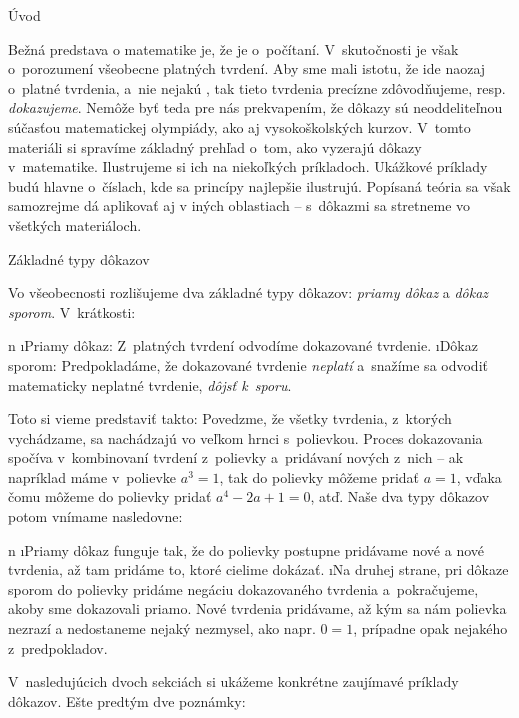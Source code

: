 





\sec Úvod

Bežná predstava o matematike je, že je o~počítaní. V~skutočnosti je však o~porozumení všeobecne platných tvrdení. Aby sme mali istotu, že ide naozaj o~platné tvrdenia, a~nie nejakú , tak tieto tvrdenia precízne zdôvodňujeme, resp. \textit{dokazujeme}. Nemôže byť teda pre nás prekvapením, že dôkazy sú neoddeliteľnou súčasťou matematickej olympiády, ako aj vysokoškolských kurzov. V~tomto materiáli si spravíme základný prehľad o~tom, ako vyzerajú dôkazy v~matematike. Ilustrujeme si ich na niekoľkých príkladoch. Ukážkové príklady budú hlavne o~číslach, kde sa princípy najlepšie ilustrujú. Popísaná teória sa však samozrejme dá aplikovať aj v iných oblastiach -- s~dôkazmi sa stretneme vo všetkých materiáloch.

\sec Základné typy dôkazov

Vo všeobecnosti rozlišujeme dva základné typy dôkazov: \textit{priamy dôkaz} a \textit{dôkaz sporom}. V~krátkosti:

\begitems \style n
\i Priamy dôkaz: Z~platných tvrdení odvodíme dokazované tvrdenie. 
\i Dôkaz sporom: Predpokladáme, že dokazované tvrdenie \textit{neplatí} a~snažíme sa odvodiť matematicky neplatné tvrdenie, \textit{dôjsť k~sporu}.
\enditems 

Toto si vieme predstaviť takto: Povedzme, že všetky tvrdenia, z~ktorých vychádzame, sa nachádzajú vo veľkom hrnci s~polievkou. Proces dokazovania spočíva v~kombinovaní tvrdení z~polievky a~pridávaní nových z~nich -- ak napríklad máme v~polievke $a^3=1$, tak do polievky môžeme pridať $a=1$, vďaka čomu môžeme do polievky pridať $a^4-2a+1=0$, atď. Naše dva typy dôkazov potom vnímame nasledovne:

\begitems \style n
\i Priamy dôkaz funguje tak, že do polievky postupne pridávame nové a nové tvrdenia, až tam pridáme to, ktoré cielime dokázať.
\i Na druhej strane, pri dôkaze sporom do polievky pridáme negáciu dokazovaného tvrdenia a~pokračujeme, akoby sme dokazovali priamo. Nové tvrdenia pridávame, až kým sa nám polievka nezrazí a nedostaneme nejaký nezmysel, ako napr. $0=1$, prípadne opak nejakého z~predpokladov.
\enditems

V~nasledujúcich dvoch sekciách si ukážeme konkrétne zaujímavé príklady dôkazov. Ešte predtým dve poznámky:

